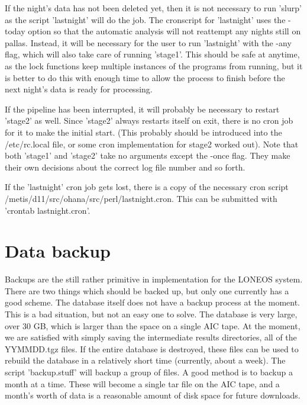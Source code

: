 \documentclass{article}
\begin{document}
If the night's data has not been deleted yet, then it is not necessary
to run 'slurp' as the script 'lastnight' will do the job.  The
cronscript for 'lastnight' uses the -today option so that the
automatic analysis will not reattempt any nights still on pallas.
Instead, it will be necessary for the user to run 'lastnight' with the
-any flag, which will also take care of running 'stage1'. This should
be safe at anytime, as the lock functions keep multiple instances of
the programs from running, but it is better to do this with enough
time to allow the process to finish before the next night's data is
ready for processing.

If the pipeline has been interrupted, it will probably be necessary to
restart 'stage2' as well.  Since 'stage2' always restarts itself on
exit, there is no cron job for it to make the initial start.  (This
probably should be introduced into the /etc/rc.local file, or some
cron implementation for stage2 worked out).  Note that both 'stage1'
and 'stage2' take no arguments except the -once flag.  They make their
own decisions about the correct log file number and so forth.

If the 'lastnight' cron job gets lost, there is a copy of the
necessary cron script /metis/d11/src/ohana/src/perl/lastnight.cron.
This can be submitted with 'crontab lastnight.cron'.  

\section{Data backup}

Backups are the still rather primitive in implementation for the
LONEOS system.  There are two things which should be backed up, but
only one currently has a good scheme.  The database itself does not
have a backup process at the moment.  This is a bad situation, but not
an easy one to solve.  The database is very large, over 30 GB, which
is larger than the space on a single AIC tape.  At the moment, we are
satisfied with simply saving the intermediate results directories, all
of the YYMMDD.tgz files.  If the entire database is destroyed, these
files can be used to rebuild the database in a relatively short time
(currently, about a week).  The script 'backup.stuff' will backup a
group of files.  A good method is to backup a month at a time.  These
will become a single tar file on the AIC tape, and a month's worth of
data is a reasonable amount of disk space for future downloads.
\end{document}
